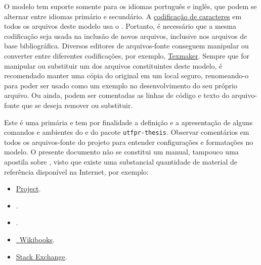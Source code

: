 O modelo tem suporte somente para os idiomas português e inglês, que podem se alternar entre idiomas primário e secundário.
A \href{https://en.wikibooks.org/wiki/LaTeX/Special_Characters}{codificação de caracteres\LinkIcon} em todos os arquivos deste modelo usa o .
Portanto, é necessário que a mesma codificação seja usada na inclusão de novos arquivos, inclusive nos arquivos de base bibliográfica.
Diversos editores de arquivos-fonte conseguem manipular ou converter entre diferentes codificações, por exemplo, \href{https://www.xm1math.net/texmaker/}{Texmaker\LinkIcon}.
Sempre que for manipular ou substituir um dos arquivos constituintes deste modelo, é recomendado manter uma cópia do original em um local seguro, renomeando-o para poder ser usado como um exemplo no desenvolvimento do seu próprio arquivo.
Ou ainda, podem ser comentadas as linhas de código e texto do arquivo-fonte que se deseja remover ou substituir.

Este  é uma  primária e tem por finalidade a definição e a apresentação de alguns comandos e ambientes do  e do pacote \texttt{utfpr-thesis}.
Observar comentários em todos os arquivos-fonte do projeto para entender configurações e formatações no modelo.
O presente documento não se constitui um manual, tampouco uma apostila sobre , visto que existe uma substancial quantidade de material de referência disponível na Internet, por exemplo:

\begin{itemize}
\item \href{https://www.latex-project.org/}{ Project\LinkIcon}.
\item \href{https://www.ctan.org/}{\LinkIcon}.
\item \href{https://www.tug.org/}{\LinkIcon}.
\item \href{https://en.wikibooks.org/wiki/LaTeX/}{ \textemdash\ Wikibooks\LinkIcon}.
\item \href{https://tex.stackexchange.com/}{ Stack Exchange\LinkIcon}.
\end{itemize}

